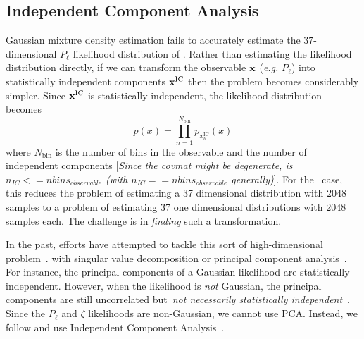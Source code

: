 \documentclass[12pt, letterpaper, preprint]{aastex}
\newcommand{\beq}{\begin{equation}}
\newcommand{\eeq}{\end{equation}}
\newcommand{\Beut}{\citetalias{beutler2017}\xspace}
\newcommand{\ms}[1]{{\color{orange}{\bf MS:}} {[\em #1}]}
\newcommand{\pca}{{\small{PCA}}\xspace}
\newcommand{\ica}{{\small{ICA}}\xspace}
\begin{document}
\subsection{Independent Component Analysis} \label{sec:ica}
Gaussian mixture density estimation fails to accurately estimate 
the $37$-dimensional $P_\ell$ likelihood distribution of \Beut. 
Rather than estimating the likelihood distribution directly, 
if we can transform the observable ${\bf x}$ (\emph{e.g.} $P_\ell$) 
into statistically independent components ${\bf x}^\mathrm{IC}$ 
then the problem becomes considerably simpler. Since ${\bf x}^\mathrm{IC}$ 
is statistically independent, the likelihood distribution becomes 
\beq \label{eq:ica_like}
p(x) = \prod\limits_{n=1}^{N_\mathrm{bin}} p_{x^\mathrm{IC}_n} (x) 
\eeq
where $N_\mathrm{bin}$ is the number of bins in the observable 
and the number of independent components \ms{Since the covmat might be
  degenerate, is $n_{IC} <= nbins_{observable}$ (with $n_{IC} ==  nbins_{observable}$ generally)}. 
For the \Beut~case, this reduces the problem of estimating a 37 
dimensional distribution with $2048$ samples to a problem of 
estimating 37 one dimensional distributions with $2048$ samples 
each. The challenge is in {\em finding} such a transformation. 

In the past, efforts have attempted to tackle this sort of 
high-dimensional problem~\citep[\emph{e.g.}][]{scoccimarro2000,eisenstein2001,gaztanaga2005,norberg2009,sinha2017}.
 with singular value decomposition or principal 
 component analysis~\citep[\pca;][]{Press:1992:NRC:148286}. For instance, the
 principal components
 of a Gaussian likelihood are statistically independent. 
However, when the likelihood is \emph{not} Gaussian, the principal components 
are still uncorrelated but~\emph{not necessarily statistically independent}~\citep{hartlap2009}. 
Since the $P_\ell$ and $\zeta$ likelihoods are non-Gaussian, we cannot 
use \pca. Instead, we follow \cite{hartlap2009} and use Independent 
Component Analysis~\citep[\ica][]{herault1984,comon1994,hyvarinen2000,
hyvarinen2001independent}. 
\end{document}
